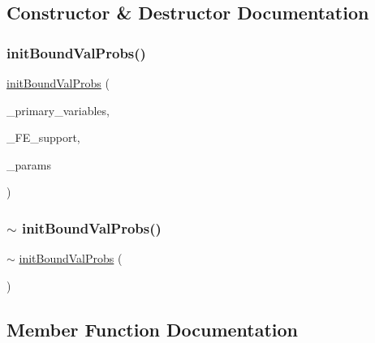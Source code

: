 \subsection{Constructor \& Destructor Documentation}
\mbox{\label{classinit_bound_val_probs_af836a88e7f9df1d43d6f93c4747858fe}} 
\subsubsection{\texorpdfstring{initBoundValProbs()}{initBoundValProbs()}}
{\footnotesize\ttfamily \mbox{\hyperlink{classinit_bound_val_probs}{init\+Bound\+Val\+Probs}} (\begin{DoxyParamCaption}\item[{std\+::vector$<$ std\+::vector$<$ std\+::string $>$ $>$}]{\+\_\+primary\+\_\+variables,  }\item[{std\+::vector$<$ std\+::vector$<$ int $>$ $>$}]{\+\_\+\+F\+E\+\_\+support,  }\item[{Parameter\+Handler \&}]{\+\_\+params }\end{DoxyParamCaption})}

\mbox{\label{classinit_bound_val_probs_a56066f199b4a30dfd060e6e1b0a78c03}} 
\subsubsection{\texorpdfstring{$\sim$ initBoundValProbs()}{~ initBoundValProbs()}}
{\footnotesize\ttfamily $\sim$ \mbox{\hyperlink{classinit_bound_val_probs}{init\+Bound\+Val\+Probs}} (\begin{DoxyParamCaption}{ }\end{DoxyParamCaption})}



\subsection{Member Function Documentation}
\mbox{\label{classinit_bound_val_probs_a8d32e81a32f1aaf5682065458548e8e2}} 
